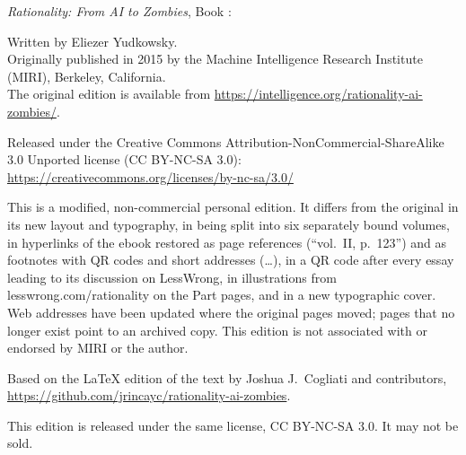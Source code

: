 {\footnotesize\raggedright
\setlength\parskip{1.1ex}
\vspace*{\fill}
\textit{Rationality: From AI to Zombies}, Book \RAZvol{\RAZVolume}:
\textit{\RAZBookTitle}

Written by Eliezer Yudkowsky.\\
Originally published in 2015 by the Machine Intelligence Research
Institute (MIRI), Berkeley, California.\\
The original edition is available from
\url{https://intelligence.org/rationality-ai-zombies/}.

Released under the Creative Commons Attribution-NonCommercial-ShareAlike
3.0 Unported license (CC BY-NC-SA 3.0):\\
\url{https://creativecommons.org/licenses/by-nc-sa/3.0/}

This is a modified, non-commercial personal edition. It differs from the
original in its new layout and typography, in being split into six
separately bound volumes, in hyperlinks of the ebook restored as page
references (``vol.~II, p.~123'') and as footnotes with QR codes and
short addresses (\RAZshortbase\ldots), in a QR code after every essay
leading to its discussion on LessWrong, in illustrations from
lesswrong.com/rationality on the Part pages, and in a new typographic
cover.
Web addresses have been updated where the original pages moved; pages that
no longer exist point to an archived copy. This edition is not
associated with or endorsed by MIRI or the author.

Based on the \LaTeX{} edition of the text by Joshua J.~Cogliati and
contributors, \url{https://github.com/jrincayc/rationality-ai-zombies}.

This edition is released under the same license, CC BY-NC-SA 3.0.
It may not be sold.

\RAZPaperNote
\par}
